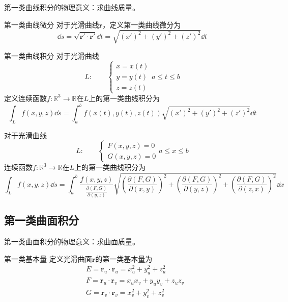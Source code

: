 \documentclass[lang = cn, scheme = chinese, thmcnt = section]{elegantbook}
\newcommand{\R}{\mathbb{R}}            %
\newcommand{\bs}{\boldsymbol}          %
\begin{document}
\begin{note}
	第一类曲线积分的物理意义：求曲线质量。
\end{note}

\begin{definition}{第一类曲线微分}
	对于光滑曲线$\bs{r}$，定义第一类曲线微分为
	$$
	\dd s
	=\sqrt{\bs{r}'\cdot\bs{r}'}\dd t
	=\sqrt{(x')^2+(y')^2+(z')^2}\dd t
	$$
\end{definition}

\begin{theorem}{第一类曲线积分}
	对于光滑曲线
	$$
	L:\qquad \begin{cases}
		x=x(t)\\
		y=y(t)\\
		z=z(t)
	\end{cases}a\le t\le b
	$$
	定义连续函数$f:\R^3\to\R$在$L$​上的第一类曲线积分为
	$$
	\int_Lf(x,y,z)\dd s=\int_a^bf(x(t),y(t),z(t))\sqrt{(x')^2+(y')^2+(z')^2}\dd t
	$$
\end{theorem}

\begin{corollary}
	对于光滑曲线
	$$
	L:\qquad \begin{cases}
		F(x,y,z)=0\\
		G(x,y,z)=0
	\end{cases}a\le x\le b
	$$
	连续函数$f:\R^3\to\R$在$L$​上的第一类曲线积分为
	$$
	\int_Lf(x,y,z)\dd s
	=\int_{a}^{b}\frac{f(x,y,z)}{\frac{\partial(F,G)}{\partial(y,z)}}\sqrt{\left(\frac{\partial(F,G)}{\partial(x,y)}\right)^2+\left(\frac{\partial(F,G)}{\partial(y,z)}\right)^2+\left(\frac{\partial(F,G)}{\partial(z,x)}\right)^2}\dd x
	$$
\end{corollary}

\subsection{第一类曲面积分}

\begin{note}
	第一类曲面积分的物理意义：求曲面质量。
\end{note}

\begin{definition}{第一类基本量}
	定义光滑曲面$\bs{r}$的第一类基本量为
	\begin{align*}
		& E=\bs{r}_u\cdot\bs{r}_u=x_u^2+y_u^2+z_u^2\\
		& F=\bs{r}_u\cdot\bs{r}_v=x_ux_v+y_uy_v+z_uz_v\\ 
		& G=\bs{r}_v\cdot\bs{r}_v=x_v^2+y_v^2+z_v^2
	\end{align*}
\end{definition}
\end{document}
